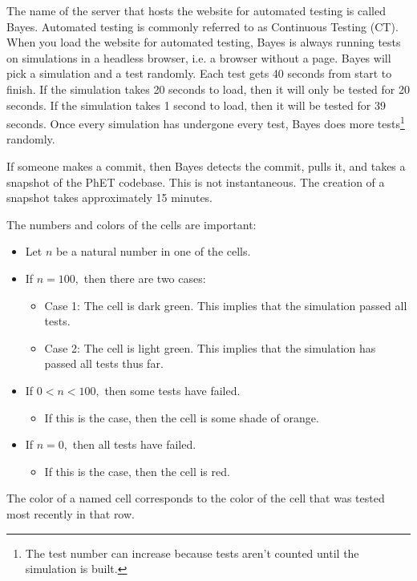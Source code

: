 \documentclass[titlepage]{article}
\begin{document}
The name of the server that hosts the website for automated testing is called Bayes. Automated testing is commonly referred to as Continuous Testing (CT). When you load the website for automated testing, Bayes is always running tests on simulations in a headless browser, i.e. a browser without a page. Bayes will pick a simulation and a test randomly. Each test gets 40 seconds from start to finish. If the simulation takes 20 seconds to load, then it will only be tested for 20 seconds. If the simulation takes 1 second to load, then it will be tested for 39 seconds. Once every simulation has undergone every test, Bayes does more tests\footnote{The test number can increase because tests aren't counted until the simulation is built.} randomly.

If someone makes a commit, then Bayes detects the commit, pulls it, and takes a snapshot of the PhET codebase. This is not instantaneous. The creation of a snapshot takes approximately 15 minutes.

The numbers and colors of the cells are important:
		\begin{itemize}
			\item Let $ n $ be a natural number in one of the cells.
			\item If $ n = 100, $ then there are two cases:
				\begin{itemize}
					\item Case 1: The cell is dark green. This implies that the simulation passed all tests.
					\item Case 2: The cell is light green. This implies that the simulation has passed all tests thus far.
				\end{itemize}
			\item If $ 0 < n < 100, $ then some tests have failed.
				\begin{itemize}
					\item If this is the case, then the cell is some shade of orange.
				\end{itemize}
			\item If $ n = 0, $ then all tests have failed.
				\begin{itemize}
					\item If this is the case, then the cell is red.
				\end{itemize}
		\end{itemize}
The color of a named cell corresponds to the color of the cell that was tested most recently in that row.
\end{document}
